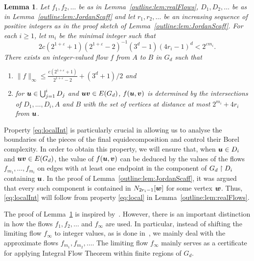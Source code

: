 \documentclass[12pt,a4paper]{amsart}
\numberwithin{equation}{section}
\newtheorem{lemma}[equation]{Lemma}
\theoremstyle{definition}
\begin{document}
\begin{lemma}
\label{outline:lem:intFlow}
Let $f_1,f_2,\dots$ be as in Lemma~\ref{outline:lem:realFlows}, $D_1,D_2,\dots$ be as in Lemma~\ref{outline:lem:JordanScaff} and let $r_1,r_2,\dots$ be an increasing sequence of positive integers as in the proof sketch of Lemma~\ref{outline:lem:JordanScaff}. For each $i\geq 1$, let $m_i$ be the minimal integer such that
\begin{equation}\label{eq:miBound}
2c\left(2^{1+\varepsilon}+1\right)\left(2^{1+\varepsilon}-2\right)^{-1}(3^d-1)(4r_i-1)^d<2^{\varepsilon m_i}.\end{equation}
There exists an integer-valued flow $f$ from $A$ to $B$ in $G_d$ such that 
\begin{enumerate}
\item \label{eq:bddInt} $\|f\|_\infty\leq \frac{c(2^{1+\varepsilon}+1)}{2^{1+\varepsilon}-2} + (3^d+1)/2$ and
\item\label{eq:localInt} for $\boldsymbol{u}\in \bigcup_{j=1}^i D_j$ and $\boldsymbol{u}\boldsymbol{v}\in E(G_d)$,  $f(\boldsymbol{u},\boldsymbol{v})$ is determined by the intersections of $D_1,\dots,D_i,A$ and $B$ with the set of vertices at distance at most $2^{m_i}+4r_i$ from $\boldsymbol{u}$.
\end{enumerate}
\end{lemma}

Property \eqref{eq:localInt} is particularly crucial in allowing us to analyse the boundaries of the pieces of the final equidecomposition and control their Borel complexity. In order to obtain this property, we will ensure that, when $\boldsymbol{u}\in D_i$ and $\boldsymbol{u}\boldsymbol{v}\in E(G_d)$, the value of $f(\boldsymbol{u},\boldsymbol{v})$ can be deduced by the values of the flows $f_{m_1},\dots,f_{m_i}$ on edges with at least one endpoint in the component of $G_d\upharpoonright D_i$ containing $\boldsymbol{u}$. In the proof of Lemma~\ref{outline:lem:JordanScaff}, it was argued that every such component is contained in $N_{2r_i-1}[\boldsymbol{w}]$ for some vertex $\boldsymbol{w}$. Thus, \eqref{eq:localInt} will follow from property \eqref{eq:local} in Lemma~\ref{outline:lem:realFlows}. 

The proof of Lemma~\ref{outline:lem:intFlow} is inspired by~\cite[Section~5]{MarksUnger17}. However, there is an important distinction in how the flows $f_1,f_2,\dots$ and $f_\infty$ are used. In particular, instead of shifting the limiting flow $f_\infty$ to integer values, as is done in~\cite{MarksUnger17}, we mainly deal with the approximate flows $f_{m_1},f_{m_2},\dots$. The limiting flow $f_\infty$ mainly serves as a certificate for applying Integral Flow Theorem within finite regions of $G_d$. 
\end{document}
